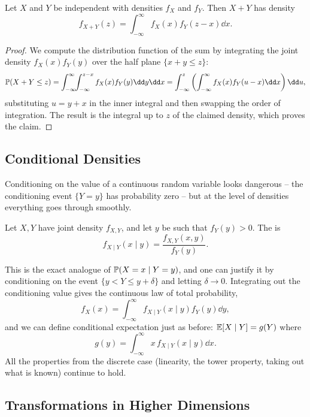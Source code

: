 \documentclass[a4paper]{scrartcl}
\begin{document}
\begin{proposition}[Convolution]
	Let $X$ and $Y$ be independent with densities $f_X$ and $f_Y$. Then $X + Y$ has density
	$$
	f_{X + Y}(z) = \int_{-\infty}^{\infty} f_X(x) f_Y(z - x) \dd x.
	$$
\end{proposition}
\begin{proof}
	We compute the distribution function of the sum by integrating the joint density $f_X(x)f_Y(y)$ over the half plane $\{x + y \leq z\}$:
	$$
	\PP(X + Y \leq z) = \int_{-\infty}^{\infty} \!\!\int_{-\infty}^{z - x} f_X(x)f_Y(y)\dd y \dd x = \int_{-\infty}^{z}\left(\int_{-\infty}^{\infty} f_X(x)f_Y(u - x)\dd x \right)\dd u,
	$$
	substituting $u = y + x$ in the inner integral and then swapping the order of integration. The result is the integral up to $z$ of the claimed density, which proves the claim.
\end{proof}

\subsection{Conditional Densities}

Conditioning on the value of a continuous random variable looks dangerous -- the conditioning event $\{Y = y\}$ has probability zero -- but at the level of densities everything goes through smoothly.

\begin{definition}
	Let $X, Y$ have joint density $f_{X, Y}$, and let $y$ be such that $f_Y(y) > 0$. The  is
	$$
	f_{X \mid Y}(x \mid y) = \frac{f_{X, Y}(x, y)}{f_Y(y)}.
	$$
\end{definition}

This is the exact analogue of $\mathbb{P}(X = x \mid Y = y)$, and one can justify it by conditioning on the event $\{y < Y \leq y + \delta\}$ and letting $\delta \rightarrow 0$. Integrating out the conditioning value gives the continuous law of total probability,
$$
f_X(x) = \int_{-\infty}^{\infty} f_{X \mid Y}(x \mid y) f_Y(y) \dd y,
$$
and we can define conditional expectation just as before: $\mathbb{E}[X \mid Y] = g(Y)$ where
$$
g(y) = \int_{-\infty}^{\infty} x \, f_{X \mid Y}(x \mid y)\dd x.
$$
All the properties from the discrete case (linearity, the tower property, taking out what is known) continue to hold.

\subsection{Transformations in Higher Dimensions}
\end{document}
